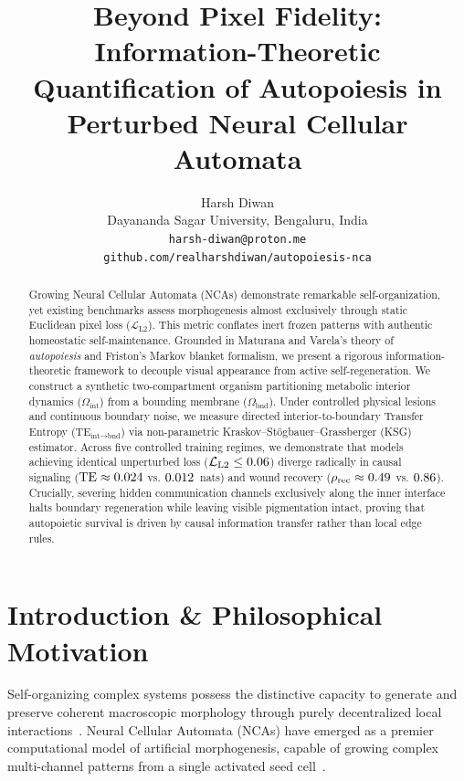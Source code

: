 \documentclass[10pt,twocolumn]{article}
\title{\textbf{Beyond Pixel Fidelity: Information-Theoretic Quantification of Autopoiesis in Perturbed Neural Cellular Automata}}
\author{
  Harsh Diwan \\
  Dayananda Sagar University, Bengaluru, India \\
  \texttt{harsh-diwan@proton.me} \\
  \texttt{github.com/realharshdiwan/autopoiesis-nca}
}
\date{}
\begin{document}
\maketitle

\begin{abstract}
Growing Neural Cellular Automata (NCAs) demonstrate remarkable self-organization, yet existing benchmarks assess morphogenesis almost exclusively through static Euclidean pixel loss ($\mathcal{L}_{\text{L2}}$). This metric conflates inert frozen patterns with authentic homeostatic self-maintenance. Grounded in Maturana and Varela's theory of \textit{autopoiesis} and Friston's Markov blanket formalism, we present a rigorous information-theoretic framework to decouple visual appearance from active self-regeneration. We construct a synthetic two-compartment organism partitioning metabolic interior dynamics ($\Omega_{\text{int}}$) from a bounding membrane ($\Omega_{\text{bnd}}$). Under controlled physical lesions and continuous boundary noise, we measure directed interior-to-boundary Transfer Entropy ($\text{TE}_{\text{int} \to \text{bnd}}$) via non-parametric Kraskov--St\"ogbauer--Grassberger (KSG) estimator. Across five controlled training regimes, we demonstrate that models achieving identical unperturbed loss ($\mathcal{L}_{\text{L2}} \le 0.06$) diverge radically in causal signaling ($\text{TE} \approx 0.024$ vs. $0.012$~nats) and wound recovery ($\rho_{\text{rec}} \approx 0.49$ vs. $0.86$). Crucially, severing hidden communication channels exclusively along the inner interface halts boundary regeneration while leaving visible pigmentation intact, proving that autopoietic survival is driven by causal information transfer rather than local edge rules.
\end{abstract}

\section{Introduction \& Philosophical Motivation}

Self-organizing complex systems possess the distinctive capacity to generate and preserve coherent macroscopic morphology through purely decentralized local interactions~\citep{maturana1980autopoiesis,mordvintsev2020growing}. Neural Cellular Automata (NCAs) have emerged as a premier computational model of artificial morphogenesis, capable of growing complex multi-channel patterns from a single activated seed cell~\citep{mordvintsev2020growing,randazzo2020adversarial}. 
\end{document}
